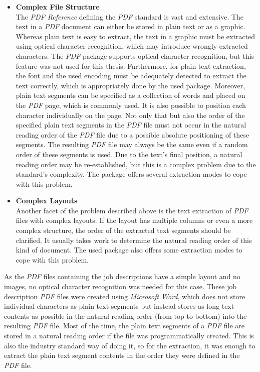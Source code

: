\documentclass[draft,final]{thesisclass} %
\begin{document}
\begin{itemize}
    \item \textbf{Complex File Structure}\\
    The \textit{PDF Reference} defining the \textit{PDF} standard is vast and extensive.
    The text in a \textit{PDF} document can either be stored in plain text or as a graphic.
    Whereas plain text is easy to extract, the text in a graphic must be extracted using optical character recognition, which may introduce wrongly extracted characters.
    The \textit{PDF} package supports optical character recognition, but this feature was not used for this thesis.
    Furthermore, for plain text extraction, the font and the used encoding must be adequately detected to extract the text correctly, which is appropriately done by the used package.
    Moreover, plain text segments can be specified as a collection of words and placed on the \textit{PDF} page, which is commonly used.
    It is also possible to position each character individually on the page.
    Not only that but also the order of the specified plain text segments in the \textit{PDF} file must not occur in the natural reading order of the \textit{PDF} file due to a possible absolute positioning of these segments. The resulting \textit{PDF} file may always be the same even if a random order of these segments is used.
    Due to the text's final position, a natural reading order may be re-established, but this is a complex problem due to the standard's complexity.
    The package offers several extraction modes to cope with this problem.
    \item \textbf{Complex Layouts}\\
    Another facet of the problem described above is the text extraction of \textit{PDF} files with complex layouts.
    If the layout has multiple columns or even a more complex structure, the order of the extracted text segments should be clarified.
    It usually takes work to determine the natural reading order of this kind of document.
    The used package also offers some extraction modes to cope with this problem.
\end{itemize}
As the \textit{PDF} files containing the job descriptions have a simple layout and no images, no optical character recognition was needed for this case.
These job description \textit{PDF} files were created using \textit{Microsoft Word}, which does not store individual characters as plain text segments but instead stores as long text contents as possible in the natural reading order (from top to bottom) into the resulting \textit{PDF} file.
Most of the time, the plain text segments of a \textit{PDF} file are stored in a natural reading order if the file was programmatically created.
This is also the industry standard way of doing it, so for the extraction, it was enough to extract the plain text segment contents in the order they were defined in the \textit{PDF} file.
\end{document}

